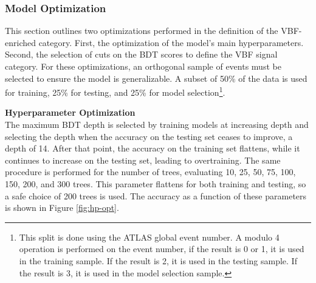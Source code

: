 \subsubsection{Model Optimization}

This section outlines two optimizations performed in the definition of the VBF-enriched category. First, the optimization of the model's main hyperparameters. Second, the selection of cuts on the \gls{BDT} scores to define the \gls{VBF} signal category. For these optimizations, an orthogonal sample of events must be selected to ensure the model is generalizable. A subset of 50\% of the data is used for training, 25\% for testing, and 25\% for model selection\footnote{This split is done using the ATLAS global event number. A modulo 4 operation is performed on the event number, if the result is 0 or 1, it is used in the training sample. If the result is 2, it is used in the testing sample. If the result is 3, it is used in the model selection sample.}.

\noindent\textbf{Hyperparameter Optimization}\\
\indent The maximum \gls{BDT} depth is selected by training models at increasing depth and selecting the depth when the accuracy on the testing set ceases to improve, a depth of 14. After that point, the accuracy on the training set flattens, while it continues to increase on the testing set, leading to overtraining. The same procedure is performed for the number of trees, evaluating 10, 25, 50, 75, 100, 150, 200, and 300 trees. This parameter flattens for both training and testing, so a safe choice of 200 trees is used. The accuracy as a function of these parameters is shown in Figure \ref{fig:hp-opt}.

